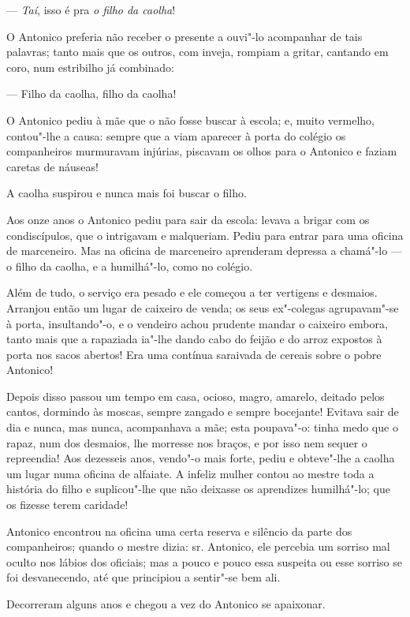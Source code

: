 --- \emph{Taí}, isso é pra \emph{o filho da caolha}!

O Antonico preferia não receber o presente a ouvi"-lo acompanhar de tais
palavras; tanto mais que os outros, com inveja, rompiam a gritar,
cantando em coro, num estribilho já combinado:

--- Filho da caolha, filho da caolha!

O Antonico pediu à mãe que o não fosse buscar à escola; e, muito
vermelho, contou"-lhe a causa: sempre que a viam aparecer à porta do
colégio os companheiros murmuravam injúrias, piscavam os olhos para o
Antonico e faziam caretas de náuseas!

A caolha suspirou e nunca mais foi buscar o filho.

Aos onze anos o Antonico pediu para sair da escola: levava a brigar com
os condiscípulos, que o intrigavam e malqueriam. Pediu para entrar para
uma oficina de marceneiro. Mas na oficina de marceneiro aprenderam
depressa a chamá"-lo --- o filho da caolha, e a humilhá"-lo, como no
colégio.

Além de tudo, o serviço era pesado e ele começou a ter vertigens e
desmaios. Arranjou então um lugar de caixeiro de venda; os seus
ex"-colegas agrupavam"-se à porta, insultando"-o, e o vendeiro achou
prudente mandar o caixeiro embora, tanto mais que a rapaziada ia"-lhe
dando cabo do feijão e do arroz expostos à porta nos sacos abertos! Era
uma contínua saraivada de cereais sobre o pobre Antonico!

Depois disso passou um tempo em casa, ocioso, magro, amarelo, deitado
pelos cantos, dormindo às moscas, sempre zangado e sempre bocejante!
Evitava sair de dia e nunca, mas nunca, acompanhava a mãe; esta
poupava"-o: tinha medo que o rapaz, num dos desmaios, lhe morresse nos
braços, e por isso nem sequer o repreendia! Aos dezesseis anos, vendo"-o
mais forte, pediu e obteve"-lhe a caolha um lugar numa oficina de
alfaiate. A infeliz mulher contou ao mestre toda a história do filho e
suplicou"-lhe que não deixasse os aprendizes humilhá"-lo; que os fizesse
terem caridade!

Antonico encontrou na oficina uma certa reserva e silêncio da parte dos
companheiros; quando o mestre dizia: sr. Antonico, ele percebia um
sorriso mal oculto nos lábios dos oficiais; mas a pouco e pouco essa
suspeita ou esse sorriso se foi desvanecendo, até que principiou a
sentir"-se bem ali.

Decorreram alguns anos e chegou a vez do Antonico se apaixonar.

